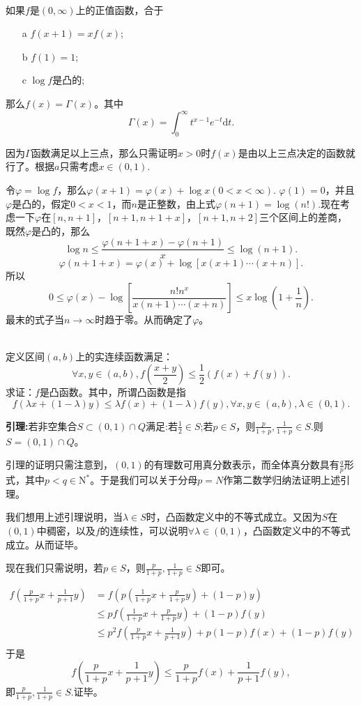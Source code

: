   \begin{example}
  \hfill\\
  如果$f$是$(0,\infty)$上的正值函数，合于
  \begin{enumerate}
  \item[a] $f(x+1)=xf(x)$;
  \item[b] $f(1)=1$;
  \item[c] $\log f$是凸的;
  \end{enumerate}
  那么$f(x)=\Gamma(x)$。其中$$\Gamma(x)=\int_0^{\infty}t^{x-1}e^{-t}\mathrm{d}t.$$
  
  因为$\Gamma$函数满足以上三点，那么只需证明$x>0$时$f(x)$是由以上三点决定的函数就行了。根据$a$只需考虑$x\in(0,1).$
  
  令$\varphi =\log f$，那么$\varphi(x+1)=\varphi(x)+\log x(0<x<\infty).$ $\varphi(1)=0$，并且$\varphi$是凸的，假定$0<x<1$，而$n$是正整数，由上式$\varphi(n+1)=\log (n!).$现在考虑一下$\varphi$在$[n,n+1]$，$[n+1,n+1+x]$，$[n+1,n+2]$三个区间上的差商，既然$\varphi$是凸的，那么$$\log n\leq\frac{\varphi(n+1+x)-\varphi(n+1)}{x}\leq\log(n+1).$$
  $$\varphi(n+1+x)=\varphi(x)+\log[x(x+1)\cdots(x+n)].$$
  所以$$0\leq\varphi(x)-\log[\frac{n!n^x}{x(n+1)\cdots(x+n)}]\leq x\log(1+\frac{1}{n}).$$
  最末的式子当$n\to\infty$时趋于零。从而确定了$\varphi$。
  \end{example}
 
\begin{example}
\hfill\\
定义区间$(a,b)$上的实连续函数满足：
$$\forall x,y \in(a,b),f(\frac{x+y}{2})\leq\frac{1}{2}(f(x)+f(y)).$$
求证：$f$是凸函数。其中，所谓凸函数是指
$$f(\lambda x+(1-\lambda)y)\leq\lambda f(x)+(1-\lambda)f(y),\forall x,y\in(a,b),\lambda\in(0,1).$$

\textbf{引理:}若非空集合$S\subset(0,1)\cap\mathit{Q}$满足:若$\frac{1}{2}\in S$;若$p\in S$，则$\frac{p}{1+p},\frac{1}{1+p}\in S.$则$S=(0,1)\cap\mathit{Q}$。

引理的证明只需注意到，$(0,1)$的有理数可用真分数表示，而全体真分数具有$\frac{q}{p}$形式，其中$p<q\in\mathrm{N}^*$。于是我们可以关于分母$p=N$作第二数学归纳法证明上述引理。

我们想用上述引理说明，当$\lambda\in S$时，凸函数定义中的不等式成立。又因为$S$在$(0,1)$中稠密，以及$f$的连续性，可以说明$\forall\lambda\in(0,1)$，凸函数定义中的不等式成立。从而证毕。

现在我们只需说明，若$p\in S$，则$\frac{p}{1+p},\frac{1}{1+p}\in S$即可。

\begin{align*}
f(\frac{p}{1+p}x+\frac{1}{p+1}y)&=f(p(\frac{1}{1+p}x+\frac{p}{1+p}y)+(1-p)y)\\
&\leq pf(\frac{1}{1+p}x+\frac{p}{1+p}y)+(1-p)f(y)\\
&\leq p^2f(\frac{p}{1+p}x+\frac{1}{p+1}y)+p(1-p)f(x)+(1-p)f(y)\\
\end{align*}
于是
$$f(\frac{p}{1+p}x+\frac{1}{p+1}y)\leq \frac{p}{1+p}f(x)+\frac{1}{p+1}f(y),$$
即$\frac{p}{1+p},\frac{1}{1+p}\in S.$证毕。
\end{example} 
 
